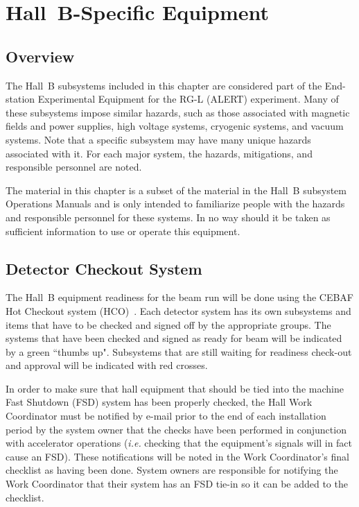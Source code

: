 \documentclass[12pt]{report}
\begin{document}
\chapter{Hall~B-Specific Equipment}

\section{Overview}

The Hall~B subsystems included in this chapter are considered part of the End-station 
Experimental Equipment for the RG-L (ALERT) experiment. Many of these subsystems impose
similar hazards, such as those associated with magnetic fields and power supplies, high
voltage systems, cryogenic systems, and vacuum systems. Note that a specific subsystem may
have many unique hazards associated with it. For each major system, the hazards, mitigations, 
and responsible personnel are noted.

The material in this chapter is a subset of the material in the Hall~B subsystem Operations 
Manuals and is only intended to familiarize people with the hazards and responsible personnel 
for these systems. In no way should it be taken as sufficient information to use or operate 
this equipment.

\section{Detector Checkout System}

The Hall~B equipment readiness for the beam run will be done using the CEBAF Hot Checkout 
system (HCO)~\cite{hco}. Each detector system has its own subsystems and items that have 
to be checked and signed off by the appropriate groups. The systems that have been checked 
and signed as ready for beam will be indicated by a green ``thumbs up". Subsystems that are 
still waiting for readiness check-out and approval will be indicated with red crosses. 

In order to make sure that hall equipment that should be tied into the machine Fast Shutdown 
(FSD) system has been properly checked, the Hall Work Coordinator must be notified by e-mail 
prior to the end of each installation period by the system owner that the checks have been 
performed in conjunction with accelerator operations ({\it i.e.} checking that the equipment's 
signals will in fact cause an FSD). These notifications will be noted in the Work Coordinator's 
final checklist as having been done. System owners are responsible for notifying the Work 
Coordinator that their system has an FSD tie-in so it can be added to the checklist.
\end{document}
